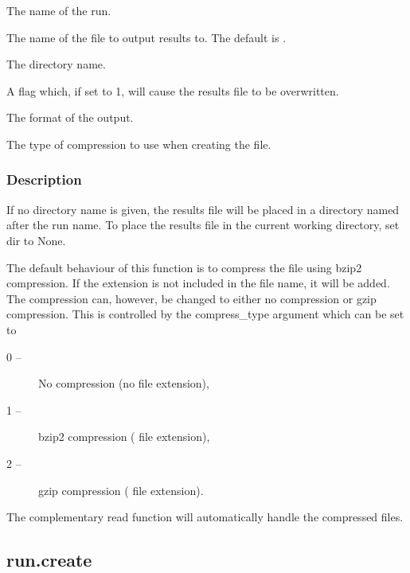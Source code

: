    The name of the run.   

   The name of the file to output results to.  The default is .   

   The directory name.   

   A flag which, if set to 1, will cause the results file to be overwritten.   

   The format of the output.   

   The type of compression to use when creating the file.  

  

  
 \subsubsection{Description} 

 If no directory name is given, the results file will be placed in a directory named after the run name.  To place the results file in the current working directory, set dir to None. 
  

 The default behaviour of this function is to compress the file using bzip2 compression.  If the extension  is not included in the file name, it will be added.  The compression can, however, be changed to either no compression or gzip compression.  This is controlled by the compress\_type argument which can be set to 
  

 \begin{description} 
 \item[0 --]  No compression (no file extension),  
 \item[1 --]  bzip2 compression ( file extension),  
 \item[2 --]  gzip compression ( file extension).  
 \end{description} 
  

 The complementary read function will automatically handle the compressed files. 
  

  

 \newpage 

 \subsection{run.create} 

